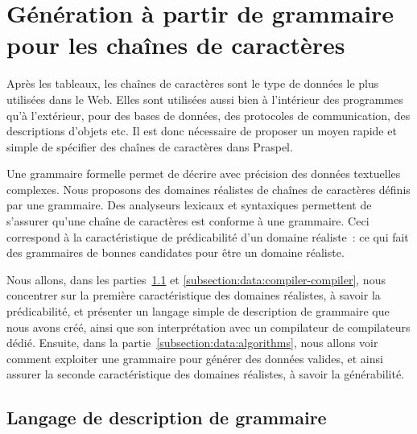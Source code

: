 \section{Génération à partir de grammaire pour les chaînes de caractères}
\label{section:data:strings}

Après les tableaux, les chaînes de caractères sont le type de données le plus
utilisées dans le Web. Elles sont utilisées aussi bien à l'intérieur des
programmes qu'à l'extérieur, pour des bases de données, des protocoles de
communication, des descriptions d'objets etc. Il est donc nécessaire de proposer
un moyen rapide et simple de spécifier des chaînes de caractères dans Praspel.

Une grammaire formelle permet de décrire avec précision des données textuelles
complexes. Nous proposons des domaines réalistes de chaînes de caractères
définis par une grammaire. Des analyseurs lexicaux et syntaxiques permettent de
s'assurer qu'une chaîne de caractères est conforme à une grammaire. Ceci
correspond à la caractéristique de prédicabilité d'un domaine réaliste~: ce qui
fait des grammaires de bonnes candidates pour être un domaine réaliste.

Nous allons, dans les parties~\ref{subsection:data:pp} et
\ref{subsection:data:compiler-compiler}, nous concentrer sur la première
caractéristique des domaines réalistes, à savoir la prédicabilité, et présenter
un langage simple de description de grammaire que nous avons créé, ainsi que son
interprétation avec un compilateur de compilateurs dédié. Ensuite, dans la
partie~\ref{subsection:data:algorithms}, nous allons voir comment exploiter une
grammaire pour générer des données valides, et ainsi assurer la seconde
caractéristique des domaines réalistes, à savoir la générabilité.

\subsection{Langage de description de grammaire}
\label{subsection:data:pp}

